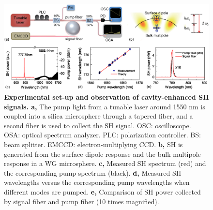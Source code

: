 \documentclass[a4paper,8pt,hyperref, twocolumn]{article}
\begin{document}
\begin{figure}[!ht]
\centering
\includegraphics[width=18cm]{Fig1.eps}
\caption{\textbf{Experimental set-up and observation of cavity-enhanced SH signals. a, }The pump light from a tunable laser around 1550 nm is coupled into a silica microsphere through a tapered fiber, and a second fiber is used to collect the SH signal. OSC: oscilloscope. OSA: optical spectrum analyzer. PLC: polarization controller. BS: beam splitter. EMCCD: electron-multiplying CCD. \textbf{b, }SH is generated from the surface dipole response and the bulk multipole response in a WG microsphere. \textbf{c, }Measured SH spectrum (red) and the corresponding pump spectrum (black). \textbf{d, }Measured SH wavelengths versus the corresponding pump wavelengths when different modes are pumped. \textbf{e, }Comparison of SH power collected by signal fiber and pump fiber (10 times magnified).}
\label{pic:Fig1}
\end{figure}
\end{document}

